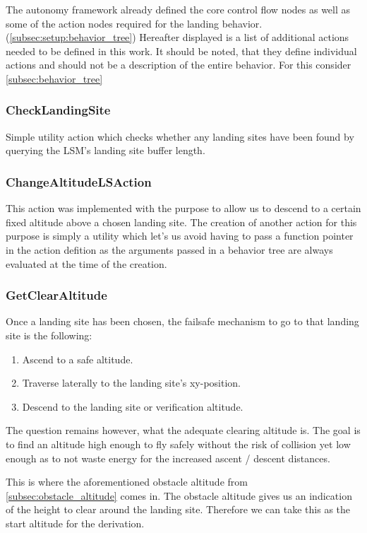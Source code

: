 The autonomy framework already defined the core control flow nodes as well as some of the action nodes required for the landing behavior. (\ref{subsec:setup:behavior_tree}) Hereafter displayed is a list of additional actions needed to be defined in this work. It should be noted, that they define individual actions and should not be a description of the entire behavior. For this consider \cref{subsec:behavior_tree}

\subsubsection{CheckLandingSite}

Simple utility action which checks whether any landing sites have been found by querying the LSM's landing site buffer length.

\subsubsection{ChangeAltitudeLSAction}

This action was implemented with the purpose to allow us to descend to a certain fixed altitude above a chosen landing site. The creation of another action for this purpose is simply a utility which let's us avoid having to pass a function pointer in the action defition as the arguments passed in a behavior tree are always evaluated at the time of the creation.


\subsubsection{GetClearAltitude}
Once a landing site has been chosen, the failsafe mechanism to go to that landing site is the following:

\begin{enumerate}
    \item Ascend to a safe altitude.
    \item Traverse laterally to the landing site's xy-position.
    \item Descend to the landing site or verification altitude.
\end{enumerate}

The question remains however, what the adequate clearing altitude is. The goal is to find an altitude high enough to fly safely without the risk of collision yet low enough as to not waste energy for the increased ascent / descent distances.

This is where the aforementioned obstacle altitude from \cref{subsec:obstacle_altitude} comes in. The obstacle altitude gives us an indication of the height to clear around the landing site. Therefore we can take this as the start altitude for the derivation.


